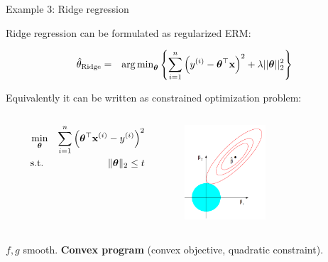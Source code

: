 \begin{vbframe}{Example 3: Ridge regression}
		
Ridge regression can be formulated as regularized ERM: 

\begin{eqnarray*}  
	\hat{\theta}_{\text{Ridge}} &=& \operatorname{arg\,min}_{\bm{\theta}} \left\{ \sum\limits_{i=1}^n \left(y^{(i)} - \bm{\theta}^\top\mathbf{x}\right)^2 + \lambda ||\bm{\theta}||_2^2 \right\}
\end{eqnarray*}

Equivalently it can be written as constrained optimization problem: 

\vspace*{-0.2cm}
\begin{columns}[T] %
	\begin{column}{.48\textwidth}
		\begin{eqnarray*}
			\min_{\bm{\theta}} && \sum_{i = 1}^n \left(\bm{\theta}^\top \mathbf{x}^{(i)} - y^{(i)}\right)^2 \\
			\text{s.t. } && \|\bm{\theta}\|_2 \le t
		\end{eqnarray*}
		
	\end{column}

	\begin{column}{.48\textwidth}
		\begin{center}
			\includegraphics[width=0.45\textwidth, keepaspectratio]{figure_man/ridge.png} 
		\end{center}
	\end{column}
\end{columns}

\vspace*{0.2cm}

$f, g$ smooth. \textbf{Convex program} (convex objective, quadratic constraint). 

\end{vbframe}
	
